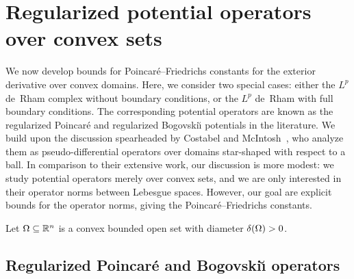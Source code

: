 \documentclass[10pt,a4paper]{article}
\newcommand{\todo}[1]{{\colorbox{yellow}{#1}}}
\newcommand{\mwl}[1]{{\color{red}#1}}
\begin{document}
\section{Regularized potential operators over convex sets}\label{section:potentialoperator}



We now develop bounds for Poincar\'e--Friedrichs constants for the exterior derivative over convex domains.
Here, we consider two special cases: 
either the $L^{p}$ de~Rham complex without boundary conditions, or the $L^{p}$ de~Rham with full boundary conditions. 
The corresponding potential operators are known as the regularized Poincar\'e and regularized Bogovski\u{\i} potentials in the literature. 
We build upon the discussion spearheaded by Costabel and McIntosh~\cite{costabel2010bogovskiui},
who analyze them as pseudo-differential operators over domains star-shaped with respect to a ball. 
% 
In comparison to their extensive work, our discussion is more modest:
we study potential operators merely over convex sets, and we are only interested in their operator norms between Lebesgue spaces.
However, our goal are explicit bounds for the operator norms, giving the Poincar\'e--Friedrichs constants. 

Let $\Omega \subseteq {\mathbb R}^{n}$ is a convex bounded open set with diameter ${\delta}(\Omega) > 0$.









\subsection{Regularized Poincar\'e and Bogovski\u{\i} operators}
\end{document}
